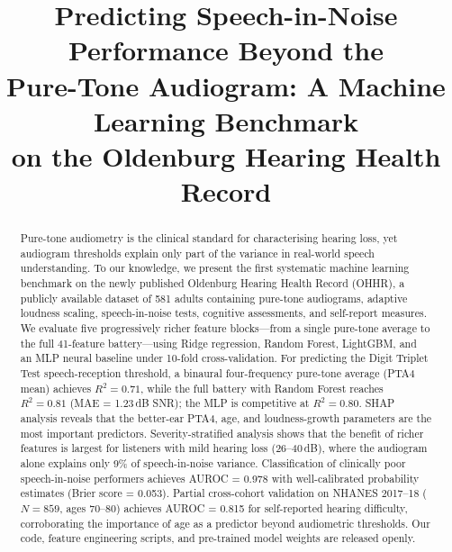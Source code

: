 \documentclass[conference]{IEEEtran}
\begin{document}
\title{Predicting Speech-in-Noise Performance Beyond the\\
Pure-Tone Audiogram: A Machine Learning Benchmark\\
on the Oldenburg Hearing Health Record}

\author{
}

\maketitle

\begin{abstract}
Pure-tone audiometry is the clinical standard for characterising hearing
loss, yet audiogram thresholds explain only part of the variance in
real-world speech understanding.  To our knowledge, we present the first systematic machine
learning benchmark on the newly published Oldenburg Hearing Health Record
(OHHR), a publicly available dataset of 581 adults containing pure-tone
audiograms, adaptive loudness scaling, speech-in-noise tests,
cognitive assessments, and self-report measures.  We evaluate five
progressively richer feature blocks---from a single pure-tone average to
the full 41-feature battery---using Ridge regression, Random Forest,
LightGBM, and an MLP neural baseline under 10-fold cross-validation.
For predicting the Digit Triplet Test speech-reception threshold, a
binaural four-frequency pure-tone average (PTA4 mean) achieves $R^2 = 0.71$,
while the full battery with Random Forest reaches $R^2 = 0.81$
(MAE = 1.23\,dB SNR); the MLP is competitive at $R^2 = 0.80$.  SHAP
analysis reveals that the better-ear PTA4, age, and loudness-growth
parameters are the most important predictors.  Severity-stratified analysis
shows that the benefit of richer features is largest for listeners with mild
hearing loss (26--40\,dB), where the audiogram alone explains only 9\% of
speech-in-noise variance.  Classification of clinically poor
speech-in-noise performers achieves AUROC = 0.978 with well-calibrated
probability estimates (Brier score = 0.053).  Partial cross-cohort
validation on NHANES 2017--18 ($N=859$, ages 70--80) achieves AUROC = 0.815
for self-reported hearing difficulty, corroborating the importance of age
as a predictor beyond audiometric thresholds.  Our code, feature
engineering scripts, and pre-trained model weights are released openly.
\end{abstract}
\end{document}

